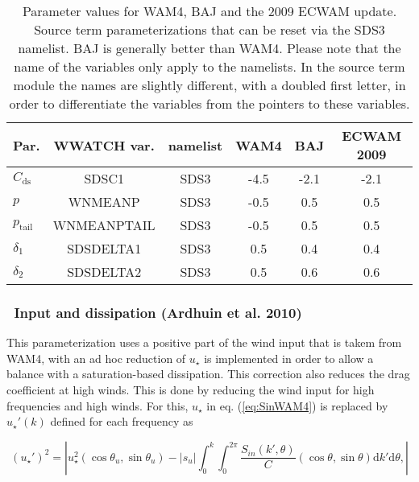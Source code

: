 \begin{table} \begin{center}
\begin{tabular}{|l|c|c|c|c|c|} \hline \hline
Par.                               &  WWATCH var.         & namelist & WAM4 & BAJ   & ECWAM 2009  \\
\hline
  $C_{\mathrm{ds}}$                 &  SDSC1          & SDS3 & -4.5 & -2.1& -2.1             \\
  $p$                               &  WNMEANP        & SDS3 & -0.5 & 0.5 &  0.5                \\
  $p_{\mathrm{tail}}$               &  WNMEANPTAIL    & SDS3 & -0.5 & 0.5 &  0.5                 \\
  $\delta_1$                        &  SDSDELTA1      & SDS3 & 0.5  & 0.4 &  0.4                  \\
  $\delta_2$                        &  SDSDELTA2      & SDS3 & 0.5  & 0.6 &  0.6 \\
  \hline \hline
\end{tabular} \end{center}
\caption{Parameter values for WAM4, BAJ and the 2009 ECWAM update. Source term
parameterizations that can be reset via the SDS3 namelist. BAJ is generally
better than WAM4. Please note that the
name of the variables only apply to the namelists. In the source term module
the names are slightly different, with a doubled first letter, in order to
differentiate the variables from the pointers to these variables.} \label{tab:WAM4_parSDS}
\end{table}

\vsssub
\subsubsection{~Input and dissipation (Ardhuin et al. 2010)} \label{sec:wam4}
\vsssub

This parameterization uses a positive part of the wind input that is takem from WAM4, with an ad hoc reduction of $u_\star$ is
implemented in order to allow a balance with a saturation-based dissipation.
This correction also reduces the drag coefficient at high winds. This is done by reducing 
the wind input for high frequencies and high winds. For this,  $u_\star$ in eq. (\ref{eq:SinWAM4}) is replaced 
by $u_\star '(k)$
defined for each frequency as

\begin{equation}
\left(u_\star '\right)^2=\left|u_\star^2 \left(\cos \theta_u, \sin
\theta_u \right) - \left|s_u\right| \int_0^k \int_0^{2 \pi}
\frac{S_{in}\left(k',\theta \right)}{C}  \left(\cos \theta, \sin
\theta \right)  {\mathrm d} k' \mathrm d
\theta,\label{ustarp}\right|
\end{equation}

